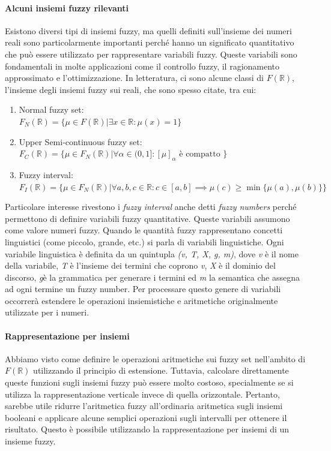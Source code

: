 \paragraph{Alcuni insiemi fuzzy rilevanti}
Esistono diversi tipi di insiemi fuzzy, ma quelli definiti sull'insieme dei numeri reali sono particolarmente importanti perché hanno un significato quantitativo che può essere utilizzato per rappresentare variabili fuzzy. Queste variabili sono fondamentali in molte applicazioni come il controllo fuzzy, il ragionamento approssimato e l'ottimizzazione. In letteratura, ci sono alcune classi di $F(\mathbb{R})$, l'insieme degli insiemi fuzzy sui reali, che sono spesso citate, tra cui:
\begin{enumerate}
    \item{Normal fuzzy set: \\ $F_N(\mathbb{R}) = \{\mu \in F(\mathbb{R}) | \exists x \in \mathbb{R} : \mu(x) = 1 \}$}
    \item{Upper Semi-continuous fuzzy set: \\$F_C(\mathbb{R}) = \{\mu \in F_N(\mathbb{R}) | \forall \alpha \in (0,1] : [\mu]_\alpha \text{ è compatto }\}$}
    \item{Fuzzy interval: \\ $F_I(\mathbb{R}) = \{\mu \in F_N(\mathbb{R}) | \forall a,b,c \in \mathbb{R} : c \in [a,b] \implies \mu(c) \geq \min\{ \mu(a),\mu(b) \} \}$}
\end{enumerate}
Particolare interesse rivestono i \textit{fuzzy interval} anche detti \textit{fuzzy numbers} perché permettono di definire variabili fuzzy quantitative. Queste variabili assumono come valore numeri fuzzy. Quando le quantità fuzzy rappresentano concetti linguistici (come piccolo, grande, etc.) si parla di variabili linguistiche. Ogni variabile linguistica è definita da un quintupla \textit{(v, T, X, g, m)}, dove \textit{v} è il nome della variabile, \textit{T} è l’insieme dei termini che coprono \textit{v}, \textit{X} è il dominio del discorso, \textit{g}è la grammatica per generare i termini ed \textit{m} la semantica che assegna ad ogni termine un fuzzy number. Per processare questo genere di variabili occorrerà estendere le operazioni insiemistiche e aritmetiche originalmente utilizzate per i numeri.

\paragraph{Rappresentazione per insiemi}
Abbiamo visto come definire le operazioni aritmetiche sui fuzzy set nell'ambito di $F(\mathbb{R})$ utilizzando il principio di estensione. Tuttavia, calcolare direttamente queste funzioni sugli insiemi fuzzy può essere molto costoso, specialmente se si utilizza la rappresentazione verticale invece di quella orizzontale. Pertanto, sarebbe utile ridurre l'aritmetica fuzzy all'ordinaria aritmetica sugli insiemi booleani e applicare alcune semplici operazioni sugli intervalli per ottenere il risultato. Questo è possibile utilizzando la rappresentazione per insiemi di un insieme fuzzy.

